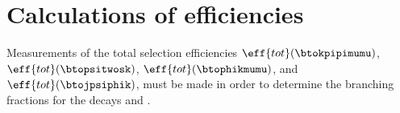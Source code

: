 \section{Calculations of efficiencies}
Measurements of the total selection efficiencies
$\eff{tot}(\btokpipimumu)$,
$\eff{tot}(\btopsitwosk)$,
$\eff{tot}(\btophikmumu)$, and
$\eff{tot}(\btojpsiphik)$,
must be made in order to determine the branching fractions for the decays \btokpipimumu and
\btophikmumu.




